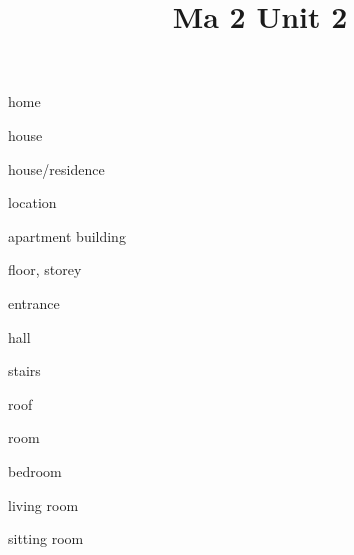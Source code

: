 \documentclass[avery5371,grid,frame]{flashcards}
\title{Ma 2 Unit 2}
\begin{document}
\begin{flashcard}{\LARGE home}
\LARGE {}
\end{flashcard}
\begin{flashcard}{\LARGE house}
\LARGE {}
\end{flashcard}
\begin{flashcard}{\LARGE house/residence}
\LARGE {}
\end{flashcard}
\begin{flashcard}{\LARGE location}
\LARGE {}
\end{flashcard}
\begin{flashcard}{\LARGE apartment building}
\LARGE {}
\end{flashcard}
\begin{flashcard}{\LARGE floor, storey}
\LARGE {}
\end{flashcard}
\begin{flashcard}{\LARGE entrance}
\LARGE {}
\end{flashcard}
\begin{flashcard}{\LARGE hall}
\LARGE {}
\end{flashcard}
\begin{flashcard}{\LARGE stairs}
\LARGE {}
\end{flashcard}
\begin{flashcard}{\LARGE roof}
\LARGE {}
\end{flashcard}
\begin{flashcard}{\LARGE room}
\LARGE {}
\end{flashcard}
\begin{flashcard}{\LARGE bedroom}
\LARGE {}
\end{flashcard}
\begin{flashcard}{\LARGE living room}
\LARGE {}
\end{flashcard}
\begin{flashcard}{\LARGE sitting room}
\LARGE {}
\end{flashcard}
\end{document}
